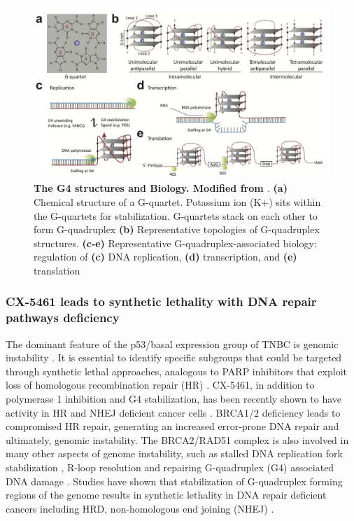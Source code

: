  \begin{figure}
\centering
\includegraphics[width=\textwidth]{Figures/chap1/G4structures.png}
	\caption[The G4 structures and their biology]
	{\small
	    \textbf{The G4 structures and Biology. Modified from \cite{kwok2017g}}.
	   \textbf{(a)} Chemical structure of a G-quartet. Potassium ion (K+) sits within the G-quartets for stabilization. G-quartets stack on each other to form G-quadruplex \textbf{(b)} Representative topologies of G-quadruplex structures. \textbf{(c-e)} Representative G-quadruplex-associated biology: regulation of \textbf{(c)} DNA replication, \textbf{(d)} transcription, and \textbf{(e)} translation
	}
	\label{fig:G4structures}
\end{figure}
 
 \subsubsection{CX-5461 leads to synthetic lethality with  DNA repair pathways deficiency}
 The dominant feature of the p53/basal expression group of TNBC is genomic instability \cite{yu2013identification}. It is essential to identify specific subgroups that could be targeted through synthetic lethal approaches, analogous to PARP inhibitors that exploit loss of homologous recombination repair (HR) \cite{fong2009inhibition}.
 CX-5461, in addition to polymerase 1 inhibition and G4 stabilization, has been recently shown to have activity in \ac{HR} and \ac{NHEJ} deficient cancer cells \cite{zimmer2016targeting,xu2017cx}. 
 BRCA1/2 deficiency leads to compromised HR repair, generating an increased error-prone DNA repair and ultimately, genomic instability. The BRCA2/RAD51 complex is also involved in many other aspects of genome instability, such as stalled DNA replication fork stabilization \cite{schlacher2011double}, R-loop resolution \cite{bhatia2014brca2} and repairing G-quadruplex (G4) associated DNA damage .
 Studies have shown that stabilization of G-quadruplex forming regions of the genome results in synthetic lethality in DNA repair deficient cancers including HRD, non-homologous end joining (NHEJ) \cite{xu2017cx, mcluckie2013g, zimmer2016targeting}. 
  
